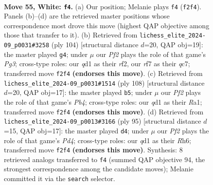 \documentclass[11pt]{article}
\begin{document}
\clearpage

\begin{figure}[p]\centering
\begin{subfigure}{0.46\textwidth}\centering
\resizebox{\linewidth}{!}{%
\newchessgame
\chessboard[
  setfen={8/5rpk/1P6/8/3pp3/6K1/5P2/3q4 w - - 1 55},
  showmover=false,
  pgfstyle=straightmove, color=movearrow, markmove={f2-f4}
]}
\caption{}
\end{subfigure}\hfill
\begin{subfigure}{0.46\textwidth}\centering
\resizebox{\linewidth}{!}{%
\newchessgame
\chessboard[
  setfen={6k1/2q3p1/4p3/p6p/7P/6PK/5r2/8 w - - 0 53},
  showmover=false,
  pgfstyle=straightmove, color=movearrow, markmove={g3-g4}
]}
\caption{}
\end{subfigure}
\\[4pt]
\begin{subfigure}{0.46\textwidth}\centering
\resizebox{\linewidth}{!}{%
\newchessgame
\chessboard[
  setfen={8/5p2/3p2k1/K7/1P2rp2/8/P7/R7 w - - 0 55},
  showmover=false,
  pgfstyle=straightmove, color=movearrow, markmove={b4-b5}
]}
\caption{}
\end{subfigure}\hfill
\begin{subfigure}{0.46\textwidth}\centering
\resizebox{\linewidth}{!}{%
\newchessgame
\chessboard[
  setfen={8/8/7r/3p4/p1k5/P7/1KPR4/8 b - - 2 48},
  showmover=false,
  pgfstyle=straightmove, color=movearrow, markmove={d5-d4}
]}
\caption{}
\end{subfigure}
\caption{\textbf{Move 55, White: \texttt{f4}.} (a) Our position; Melanie plays \texttt{f4} (\texttt{f2f4}). Panels (b)--(d) are the retrieved master positions whose correspondence most drove this move (highest QAP objective among those that transfer to it). (b) Retrieved from \texttt{lichess\_elite\_2024-09\_p0031\#3258} (ply 104) [structural distance $d$=20, QAP obj=19]: the master played \texttt{g4}; under $\mu$ our \emph{Pf2} plays the role of that game's \emph{Pg3}; cross-type roles: our \emph{q}d1 as their \emph{r}f2, our \emph{r}f7 as their \emph{q}c7; transferred move \texttt{f2f4} \textbf{(endorses this move)}. (c) Retrieved from \texttt{lichess\_elite\_2024-09\_p0031\#1514} (ply 108) [structural distance $d$=20, QAP obj=17]: the master played \texttt{b5}; under $\mu$ our \emph{Pf2} plays the role of that game's \emph{Pb4}; cross-type roles: our \emph{q}d1 as their \emph{R}a1; transferred move \texttt{f2f4} \textbf{(endorses this move)}. (d) Retrieved from \texttt{lichess\_elite\_2024-09\_p0013\#3166} (ply 95) [structural distance $d$=15, QAP obj=17]: the master played \texttt{d4}; under $\mu$ our \emph{Pf2} plays the role of that game's \emph{Pd4}; cross-type roles: our \emph{q}d1 as their \emph{R}h6; transferred move \texttt{f2f4} \textbf{(endorses this move)}. Synthesis: 8 retrieved analogs transferred to \texttt{f4} (summed QAP objective 94, the strongest correspondence among the candidate moves); Melanie committed it via the \texttt{search} selector.}
\label{fig:thought-m108}
\end{figure}
\end{document}
